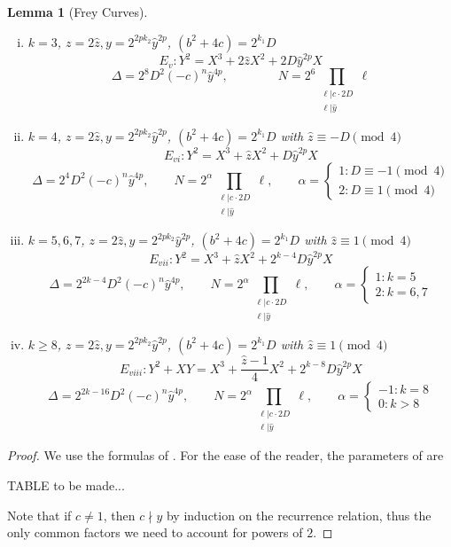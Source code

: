 \documentclass[12pt]{amsart}
\newtheorem{lem}[thm]{Lemma}
\theoremstyle{definition}
\newcommand{\notdiv}{\nmid}
\begin{document}
\begin{lem}[Frey Curves]
\begin{enumerate}[(i)]
\[D \equiv \ \ 1 \pmod{4}  \qquad \qquad  E_{iv} : Y^2 = X^3 +2\hat{z}X^2 +(-c)^nX \]
\[\Delta = 2^{6}D(-c)^{2n}\hat{y}^{2p}, \qquad \qquad N = 2^{5}\prod_{\substack{ \ell | c \cdot D \\ \ell | \hat{y}}} \ell  \]

\item $k = 3$, $z = 2 \hat{z}, y = 2^{2pk_2}\hat{y}^{2p}$, $(b^2+4c) = 2^{k_1}D$
\[ E_{v} : Y^2 = X^3 + 2\hat{z}X^2 + 2D\hat{y}^{2p}X \]
\[ \Delta = 2^8D^2(-c)^n\hat{y}^{4p} , \qquad \qquad N = 2^6 \prod_{\substack{ \ell | c \cdot 2D \\ \ell | \hat{y}}} \ell  \]

\item $k=4$, $z = 2 \hat{z}, y = 2^{2pk_2}\hat{y}^{2p}$, $(b^2+4c) = 2^{k_1}D$ with $\hat{z} \equiv -D \pmod{4}$
\[ E_{vi} : Y^2 = X^3 +\hat{z}X^2 + D \hat{y}^{2p} X \]
\[ \Delta = 2^4D^2(-c)^n\hat{y}^{4p}, \qquad N = 2^\alpha \prod_{\substack{ \ell | c \cdot 2D \\ \ell | \hat{y}}} \ell ,  \qquad \alpha =  \begin{cases} 1: D \equiv -1 \pmod{4}\\ 2 : D \equiv 1 \pmod{4} \end{cases} \]


\item $k = 5,6,7$, $z = 2 \hat{z}, y = 2^{2pk_2}\hat{y}^{2p}$, $(b^2+4c) = 2^{k_1}D$ with $\hat{z} \equiv 1 \pmod{4}$
\[ E_{vii} : Y^2 = X^3 + \hat{z}X^2 + 2^{k-4}D \hat{y}^{2p} X \]
\[ \Delta = 2^{2k-4}D^2(-c)^n\hat{y}^{4p}, \qquad N = 2^\alpha \prod_{\substack{ \ell | c \cdot 2D \\ \ell | \hat{y}}} \ell ,  \qquad \alpha =  \begin{cases} 1: k = 5 \\ 2 : k = 6,7 \end{cases} \]

\item $k\geq 8$, $z = 2 \hat{z}, y = 2^{2pk_2}\hat{y}^{2p}$, $(b^2+4c) = 2^{k_1}D$ with $\hat{z} \equiv 1 \pmod{4}$
\[ E_{viii} : Y^2 + XY = X^3 + \frac{\hat{z}-1}{4} X^2 + 2^{k-8}D \hat{y}^{2p} X \]
\[ \Delta = 2^{2k-16}D^2(-c)^n\hat{y}^{4p}, \qquad N = 2^\alpha \prod_{\substack{ \ell | c \cdot 2D \\ \ell | \hat{y}}} \ell ,  \qquad \alpha =  \begin{cases} -1: k = 8 \\ 0 : k > 8 \end{cases} \]


\end{enumerate}
\end{lem}
\begin{proof}
We use the formulas of \cite{bennett04}.  For the ease of the reader, the parameters of \cite{bennett04} are 
\begin{center} TABLE to be made... \end{center}
Note that if $c \neq 1$, then $c \notdiv y$ by induction on the recurrence relation, thus the only common factors we need to account for powers of $2$.
\end{proof}
\end{document}
